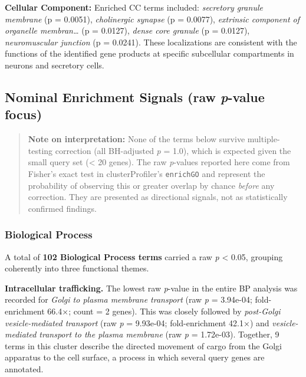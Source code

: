 \documentclass[
  11pt,
]{article}
\begin{document}
\textbf{Cellular Component:} Enriched CC terms included: \emph{secretory
granule membrane} (p = 0.0051), \emph{cholinergic synapse} (p = 0.0077),
\emph{extrinsic component of organelle membran\ldots{}} (p = 0.0127),
\emph{dense core granule} (p = 0.0127), \emph{neuromuscular junction} (p
= 0.0241). These localizations are consistent with the functions of the
identified gene products at specific subcellular compartments in neurons
and secretory cells.

\subsection{\texorpdfstring{Nominal Enrichment Signals (raw
\emph{p}-value
focus)}{Nominal Enrichment Signals (raw p-value focus)}}\label{nominal-enrichment-signals-raw-p-value-focus}

\begin{quote}
\textbf{Note on interpretation:} None of the terms below survive
multiple-testing correction (all BH-adjusted \emph{p} = 1.0), which is
expected given the small query set (\textless{} 20 genes). The raw
\emph{p}-values reported here come from Fisher's exact test in
clusterProfiler's \texttt{enrichGO} and represent the probability of
observing this or greater overlap by chance \emph{before} any
correction. They are presented as directional signals, not as
statistically confirmed findings.
\end{quote}

\subsubsection{Biological Process}\label{biological-process}

A total of \textbf{102 Biological Process terms} carried a raw \emph{p}
\textless{} 0.05, grouping coherently into three functional themes.

\textbf{Intracellular trafficking.} The lowest raw \emph{p}-value in the
entire BP analysis was recorded for \emph{Golgi to plasma membrane
transport} (raw \emph{p} = 3.94e-04; fold-enrichment 66.4×; count = 2
genes). This was closely followed by \emph{post-Golgi vesicle-mediated
transport} (raw \emph{p} = 9.93e-04; fold-enrichment 42.1×) and
\emph{vesicle-mediated transport to the plasma membrane} (raw \emph{p} =
1.72e-03). Together, 9 terms in this cluster describe the directed
movement of cargo from the Golgi apparatus to the cell surface, a
process in which several query genes are annotated.
\end{document}
